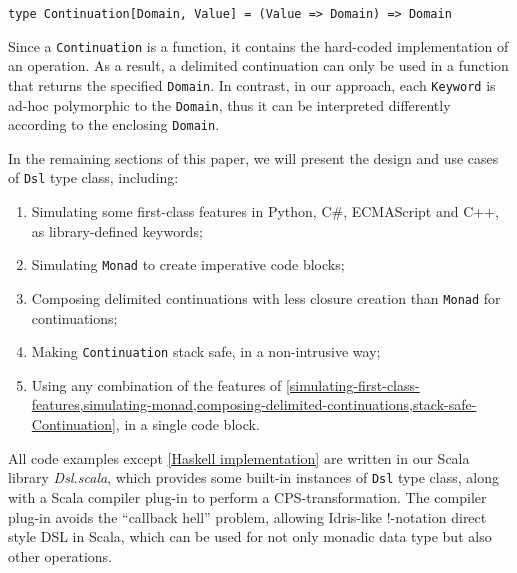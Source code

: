 \begin{lstlisting}[caption={The definition of a delimited continuation},label={Continuation}]
type Continuation[Domain, Value] = (Value => Domain) => Domain
\end{lstlisting}

Since a \lstinline{Continuation} is a function, it contains the hard-coded implementation of an operation. As a result, a delimited continuation can only be used in a function that returns the specified \lstinline{Domain}. In contrast, in our approach, each \lstinline{Keyword} is ad-hoc polymorphic to the \lstinline{Domain}, thus it can be interpreted differently according to the enclosing \lstinline{Domain}.

In the remaining sections of this paper, we will present the design and use cases of \lstinline{Dsl} type class, including:

\begin{enumerate}
  \item Simulating some first-class features in Python, C\#, ECMAScript and C++, as library-defined keywords;
  \label{simulating-first-class-features}

  \item Simulating \lstinline{Monad} to create imperative code blocks;
  \label{simulating-monad}

  \item Composing delimited continuations with less closure creation than \lstinline{Monad} for continuations;
  \label{composing-delimited-continuations}

  \item Making \lstinline{Continuation} stack safe, in a non-intrusive way; %
  \label{stack-safe-Continuation}

  \item Using any combination of the features of \cref{simulating-first-class-features,simulating-monad,composing-delimited-continuations,stack-safe-Continuation}, in a single code block.
\end{enumerate}

All code examples except \cref{Haskell implementation} are written in our Scala library \textit{Dsl.scala}, which provides some built-in instances of \lstinline{Dsl} type class, along with a Scala compiler plug-in to perform a CPS-transformation. The compiler plug-in avoids the ``callback hell'' problem, allowing Idris-like !-notation \cite{brady2013idris} direct style DSL in Scala, which can be used for not only monadic data type but also other operations.


